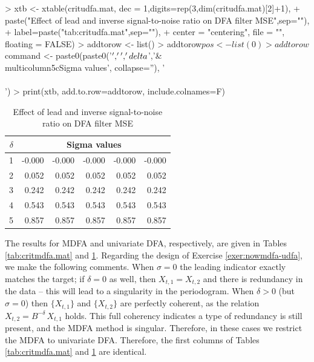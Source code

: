 \documentclass[a4paper]{book}
\begin{document}
\begin{Schunk}
\begin{Sinput}
> xtb <-  xtable(critudfa.mat, dec = 1,digits=rep(3,dim(critudfa.mat)[2]+1),
+   paste("Effect of lead and  inverse signal-to-noise ratio on DFA filter MSE",sep=""),
+   label=paste("tab:critudfa.mat",sep=""),
+   center = "centering", file = "", floating = FALSE)
> addtorow <- list()
> addtorow$pos <- list(0)
> addtorow$command <- paste0(paste0('$','\\','delta$','& \\multicolumn{5}{c}{Sigma values}', collapse=''), '\\\\')
> print(xtb, add.to.row=addtorow, include.colnames=F)
\end{Sinput}
\begin{Soutput}
\begin{table}[ht]
\centering
\begin{tabular}{rrrrrr}
  \hline
  $\delta$& \multicolumn{5}{c}{Sigma values}\\ \hline
1 & -0.000 & -0.000 & -0.000 & -0.000 & -0.000 \\ 
  2 & 0.052 & 0.052 & 0.052 & 0.052 & 0.052 \\ 
  3 & 0.242 & 0.242 & 0.242 & 0.242 & 0.242 \\ 
  4 & 0.543 & 0.543 & 0.543 & 0.543 & 0.543 \\ 
  5 & 0.857 & 0.857 & 0.857 & 0.857 & 0.857 \\ 
   \hline
\end{tabular}
\caption{Effect of lead and  inverse signal-to-noise ratio on DFA filter MSE} 
\label{tab:critudfa.mat}
\end{table}
\end{Soutput}
\end{Schunk}

 The results for MDFA and univariate DFA, respectively, are given in 
Tables \ref{tab:critmdfa.mat} and \ref{tab:critudfa.mat}.
Regarding the design of Exercise \ref{exer:nowmdfa-udfa}, we make the following 
comments.  When $\sigma = 0$ the leading indicator exactly matches the target;
 if $\delta = 0$ as well, then $X_{t,1} = X_{t,2}$ and there is redundancy in
 the data -- this will lead to a singularity in the periodogram.  When 
 $\delta > 0$ (but $\sigma = 0$) then $\{ X_{t,1} \}$ and $\{ X_{t,2} \}$
 are perfectly coherent, as the relation $X_{t,2} = B^{-\delta} \, X_{t,1}$ holds.
 This full coherency indicates a type of redundancy is still present,
 and the MDFA method is singular.  Therefore, in these cases we restrict
 the MDFA to univariate DFA.  Therefore, the first columns of 
 Tables \ref{tab:critmdfa.mat} and \ref{tab:critudfa.mat} are identical.
\end{document}
